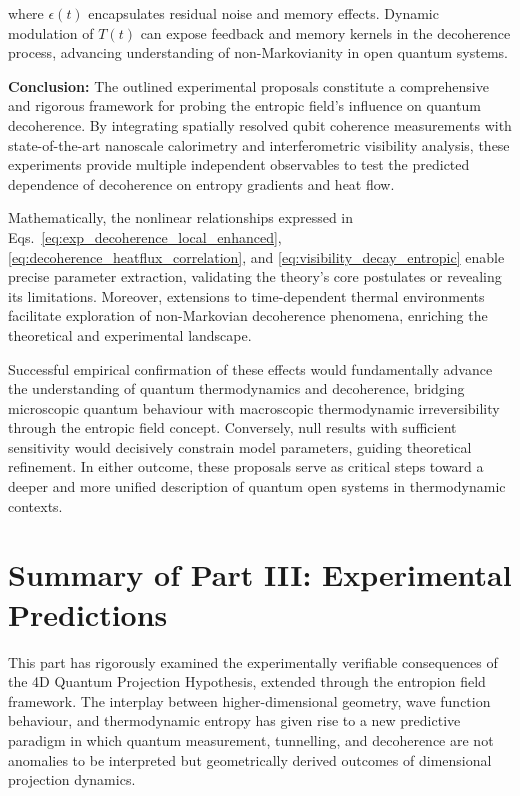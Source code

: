 \documentclass[12pt]{article}
\begin{document}
where \(\epsilon(t)\) encapsulates residual noise and memory effects. Dynamic modulation of \(T(t)\) can expose feedback and memory kernels in the decoherence process, advancing understanding of non-Markovianity in open quantum systems.

\bigskip

\noindent
\textbf{Conclusion:} The outlined experimental proposals constitute a comprehensive and rigorous framework for probing the entropic field's influence on quantum decoherence. By integrating spatially resolved qubit coherence measurements with state-of-the-art nanoscale calorimetry and interferometric visibility analysis, these experiments provide multiple independent observables to test the predicted dependence of decoherence on entropy gradients and heat flow.

Mathematically, the nonlinear relationships expressed in Eqs.~\eqref{eq:exp_decoherence_local_enhanced}, \eqref{eq:decoherence_heatflux_correlation}, and \eqref{eq:visibility_decay_entropic} enable precise parameter extraction, validating the theory's core postulates or revealing its limitations. Moreover, extensions to time-dependent thermal environments facilitate exploration of non-Markovian decoherence phenomena, enriching the theoretical and experimental landscape.

Successful empirical confirmation of these effects would fundamentally advance the understanding of quantum thermodynamics and decoherence, bridging microscopic quantum behaviour with macroscopic thermodynamic irreversibility through the entropic field concept. Conversely, null results with sufficient sensitivity would decisively constrain model parameters, guiding theoretical refinement. In either outcome, these proposals serve as critical steps toward a deeper and more unified description of quantum open systems in thermodynamic contexts.

\section*{Summary of Part III: Experimental Predictions}

This part has rigorously examined the experimentally verifiable consequences of the 4D Quantum Projection Hypothesis, extended through the entropion field framework. The interplay between higher-dimensional geometry, wave function behaviour, and thermodynamic entropy has given rise to a new predictive paradigm in which quantum measurement, tunnelling, and decoherence are not anomalies to be interpreted but geometrically derived outcomes of dimensional projection dynamics.
\end{document}
